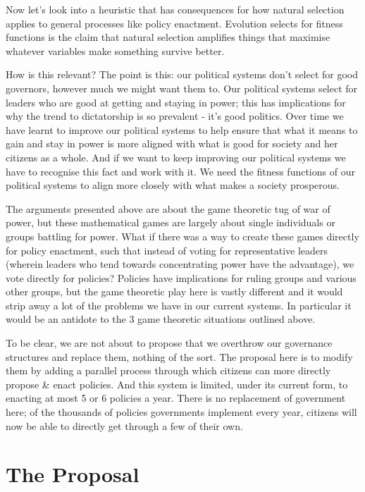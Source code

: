 \documentclass[twoside]{article}
\theoremstyle{definition}
\begin{document}
Now let’s look into a heuristic that has consequences for how natural selection applies to general processes like policy enactment. Evolution selects for fitness functions is the claim that natural selection amplifies things that maximise whatever variables make something survive better. 

How is this relevant? The point is this: our political systems don’t select for good governors, however much we might want them to. Our political systems select for leaders who are good at getting and staying in power; this has implications for why the trend to dictatorship is so prevalent - it’s good politics. Over time we have learnt to improve our political systems to help ensure that what it means to gain and stay in power is more aligned with what is good for society and her citizens as a whole. And if we want to keep improving our political systems we have to recognise this fact and work with it. We need the fitness functions of our political systems to align more closely with what makes a society prosperous.

The arguments presented above are about the game theoretic tug of war of power, but these mathematical games are largely about single individuals or groups battling for power. What if there was a way to create these games directly for policy enactment, such that instead of voting for representative leaders (wherein leaders who tend towards concentrating power have the advantage), we vote directly for policies? Policies have implications for ruling groups and various other groups, but the game theoretic play here is vastly different and it would strip away a lot of the problems we have in our current systems. In particular it would be an antidote to the 3 game theoretic situations outlined above.

To be clear, we are not about to propose that we overthrow our governance structures and replace them, nothing of the sort. The proposal here is to modify them by adding a parallel process through which citizens can more directly propose \& enact policies. And this system is limited, under its current form, to enacting at most 5 or 6 policies a year. There is no replacement of government here; of the thousands of policies governments implement every year, citizens will now be able to directly get through a few of their own.

\section{The Proposal}
\end{document}
